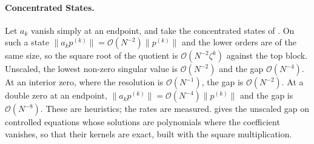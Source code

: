 \paragraph{Concentrated States.} Let $a_k$ vanish simply at an endpoint, and take the concentrated states of . On such a state $\|a_kp^{(k)}\|=\mathcal{O}(N^{-2})\|p^{(k)}\|$ and the lower orders are of the same size, so the square root of the quotient is $\mathcal{O}(N^{-2}\zeta^k)$ against the top block. Unscaled, the lowest non-zero singular value is $\mathcal{O}(N^{-2})$ and the gap $\mathcal{O}(N^{-4})$. At an interior zero, where the resolution is $\mathcal{O}(N^{-1})$, the gap is $\mathcal{O}(N^{-2})$. At a double zero at an endpoint, $\|a_kp^{(k)}\|=\mathcal{O}(N^{-4})\|p^{(k)}\|$ and the gap is $\mathcal{O}(N^{-8})$. These are heuristics; the rates are measured.  gives the unscaled gap on controlled equations whose solutions are polynomials where the coefficient vanishes, so that their kernels are exact, built with the square multiplication.

